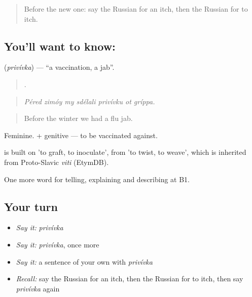 \label{lesson:RU-C487-privivka}



\begin{quote}
Before the new one: say the Russian for an itch, then the Russian for to itch.
\end{quote}

\subsection*{You'll want to know: }
\textbf{} (\emph{privívka}) — \textquotedblleft{}a vaccination, a jab\textquotedblright{}.

\begin{quote}
      .
\end{quote}

\begin{quote}
\emph{Péred zimóy my sdélali privívku ot gríppa.}
\end{quote}

\begin{quote}
Before the winter we had a flu jab.
\end{quote}

Feminine. \emph{  } + genitive — to be vaccinated against.

\begin{cousinweb}
\emph{} is built on \emph{} 'to graft, to inoculate', from \emph{} 'to twist, to weave', which is inherited from Proto-Slavic \emph{viti} (EtymDB).
\end{cousinweb}

\begin{grammarlens}[title={What you've built}]
One more word for telling, explaining and describing at B1.
\end{grammarlens}

\subsection*{Your turn}
\begin{itemize}
\raggedright
  \item \emph{Say it:} \emph{privívka}
  \item \emph{Say it:} \emph{privívka}, once more
  \item \emph{Say it:} a sentence of your own with \emph{privívka}
  \item \emph{Recall:} say the Russian for an itch, then the Russian for to itch, then say \emph{privívka} again
\end{itemize}

